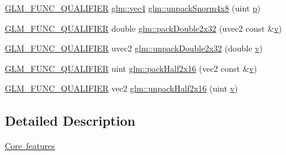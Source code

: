 \begin{DoxyCompactItemize}
\item 
\mbox{\hyperlink{setup_8hpp_a33fdea6f91c5f834105f7415e2a64407}{G\+L\+M\+\_\+\+F\+U\+N\+C\+\_\+\+Q\+U\+A\+L\+I\+F\+I\+ER}} \mbox{\hyperlink{group__core__types_ga5881b1b022d7fd1b7218f5916532dd02}{glm\+::vec4}} \mbox{\hyperlink{group__core__func__packing_ga2db488646d48b7c43d3218954523fe82}{glm\+::unpack\+Snorm4x8}} (uint \mbox{\hyperlink{_s_d_l__opengl__glext_8h_aa5367c14d90f462230c2611b81b41d23}{p}})
\item 
\mbox{\hyperlink{setup_8hpp_a33fdea6f91c5f834105f7415e2a64407}{G\+L\+M\+\_\+\+F\+U\+N\+C\+\_\+\+Q\+U\+A\+L\+I\+F\+I\+ER}} double \mbox{\hyperlink{group__core__func__packing_gaa916ca426b2bb0343ba17e3753e245c2}{glm\+::pack\+Double2x32}} (uvec2 const \&\mbox{\hyperlink{_s_d_l__opengl_8h_a10a82eabcb59d2fcd74acee063775f90}{v}})
\item 
\mbox{\hyperlink{setup_8hpp_a33fdea6f91c5f834105f7415e2a64407}{G\+L\+M\+\_\+\+F\+U\+N\+C\+\_\+\+Q\+U\+A\+L\+I\+F\+I\+ER}} uvec2 \mbox{\hyperlink{group__core__func__packing_ga5f4296dc5f12f0aa67ac05b8bb322483}{glm\+::unpack\+Double2x32}} (double \mbox{\hyperlink{_s_d_l__opengl_8h_a10a82eabcb59d2fcd74acee063775f90}{v}})
\item 
\mbox{\hyperlink{setup_8hpp_a33fdea6f91c5f834105f7415e2a64407}{G\+L\+M\+\_\+\+F\+U\+N\+C\+\_\+\+Q\+U\+A\+L\+I\+F\+I\+ER}} uint \mbox{\hyperlink{group__core__func__packing_ga20f134b07db3a3d3a38efb2617388c92}{glm\+::pack\+Half2x16}} (vec2 const \&\mbox{\hyperlink{_s_d_l__opengl_8h_a10a82eabcb59d2fcd74acee063775f90}{v}})
\item 
\mbox{\hyperlink{setup_8hpp_a33fdea6f91c5f834105f7415e2a64407}{G\+L\+M\+\_\+\+F\+U\+N\+C\+\_\+\+Q\+U\+A\+L\+I\+F\+I\+ER}} vec2 \mbox{\hyperlink{group__core__func__packing_gaf59b52e6b28da9335322c4ae19b5d745}{glm\+::unpack\+Half2x16}} (uint \mbox{\hyperlink{_s_d_l__opengl_8h_a10a82eabcb59d2fcd74acee063775f90}{v}})
\end{DoxyCompactItemize}


\subsection{Detailed Description}
\mbox{\hyperlink{group__core}{Core features}} 
